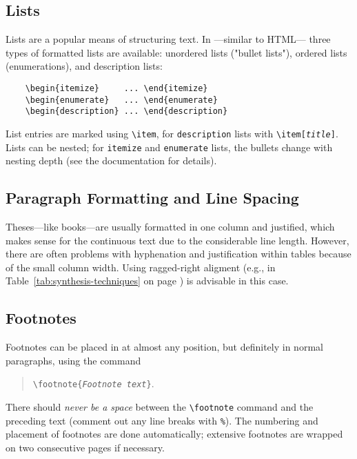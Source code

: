 \subsection{Lists}

Lists are a popular means of structuring text. In \latex---similar to HTML---
three types of formatted lists are available: unordered lists ("bullet lists"),
ordered lists (enumerations), and description lists:
%
\begin{verbatim}
    \begin{itemize}     ... \end{itemize}
    \begin{enumerate}   ... \end{enumerate}
    \begin{description} ... \end{description}
\end{verbatim}
%
List entries are marked using \verb!\item!, for \texttt{description} lists with
\verb!\item[!\texttt{\em title}\verb!]!. Lists can be nested; for
\texttt{itemize} and \texttt{enumerate} lists, the bullets change with nesting
depth (see the \latex documentation for details).

\subsection{Paragraph Formatting and Line Spacing}

Theses---like books---are usually formatted in one column and justified, which
makes sense for the continuous text due to the considerable line length.
However, there are often problems with hyphenation and justification within
tables because of the small column width. Using ragged-right aligment (e.g., in
Table~\ref{tab:synthesis-techniques} on page \pageref{tab:synthesis-techniques})
is advisable in this case.

\subsection{Footnotes}

Footnotes can be placed in \latex at almost any position, but definitely in
normal paragraphs, using the command
%
\begin{quote}
    \verb!\footnote{!\texttt{\em Footnote text}\verb!}!.
\end{quote}
%
There should \emph{never be a space} between the \verb!\footnote! command and
the preceding text (comment out any line breaks with \verb!%!). The numbering
and placement of footnotes are done automatically; extensive footnotes are
wrapped on two consecutive pages if necessary.

